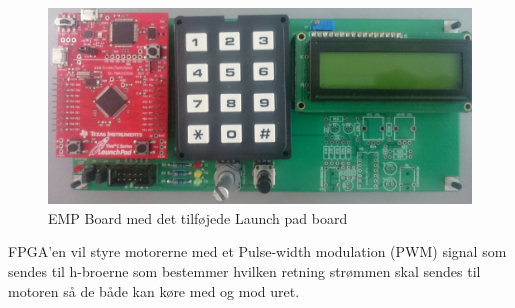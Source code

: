 \begin{figure}[!ht]
	\begin{center}
		\includegraphics[scale=0.1, angle =0]{Billeder/EMP_BOARD.JPG}
	\end{center}
\caption{EMP Board med det tilføjede Launch pad board}
\label{fig:EMP_BOARD}
\end{figure}

FPGA'en vil styre motorerne med et Pulse-width modulation (PWM) signal som sendes til h-broerne som bestemmer hvilken retning strømmen skal sendes til motoren så de både kan køre med og mod uret.


